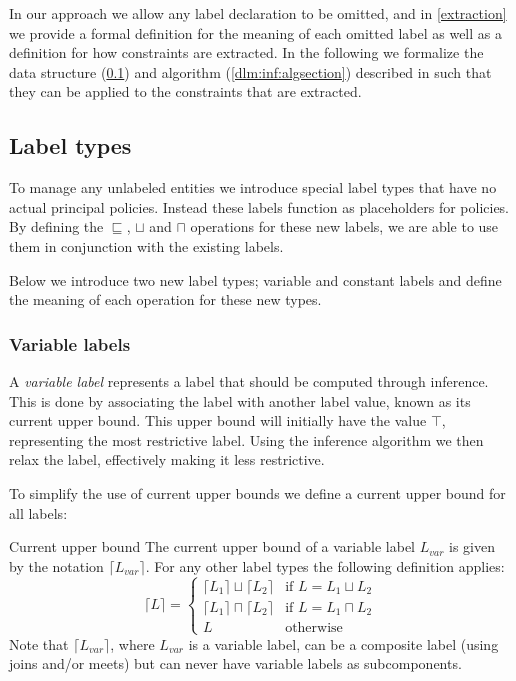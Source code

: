 In our approach we allow any label declaration to be omitted, and in \cref{extraction} we provide a formal definition for the meaning of each omitted label as well as a definition for how constraints are extracted.
In the following we formalize the data structure (\cref{dlm:inf:types}) and algorithm (\cref{dlm:inf:algsection}) described in \cite{myers1997} such that they can be applied to the constraints that are extracted.

\subsection{Label types}\label{dlm:inf:types}
To manage any unlabeled entities we introduce special label types that have no actual principal policies.
Instead these labels function as placeholders for policies.
By defining the $\sqsubseteq$, $\sqcup$ and $\sqcap$ operations for these new labels, we are able to use them in conjunction with the existing labels.

Below we introduce two new label types; variable and constant labels and define the meaning of each operation for these new types.

\subsubsection{Variable labels}
A \textit{variable label} represents a label that should be computed through inference.
This is done by associating the label with another label value, known as its current upper bound.
This upper bound will initially have the value $\top$, representing the most restrictive label.
Using the inference algorithm we then relax the label, effectively making it less restrictive.

To simplify the use of current upper bounds we define a current upper bound for all labels:

\begin{definition}{Current upper bound}\label{dlm:def:upperbound}
  The current upper bound of a variable label $L_{var}$ is given by the notation $\lceil L_{var} \rceil$.
  For any other label types the following definition applies:
  \[
  \lceil L \rceil = 
  \begin{cases}
    \lceil L_1 \rceil \sqcup \lceil L_2 \rceil & \text{if } L = L_1 \sqcup L_2 \\
    \lceil L_1 \rceil \sqcap \lceil L_2 \rceil & \text{if } L = L_1 \sqcap L_2 \\
    L & \text{otherwise}
  \end{cases}
  \]
  Note that $\lceil L_{var} \rceil$, where $L_{var}$ is a variable label, can be a composite label (using joins and/or meets) but can never have variable labels as subcomponents.
\end{definition}


